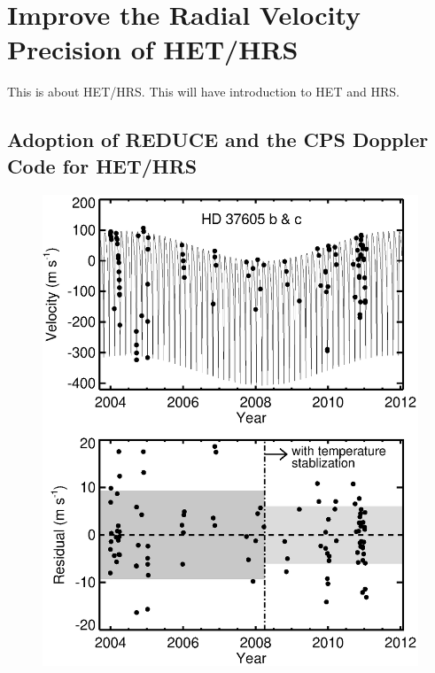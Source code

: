 \chapter{Improve the Radial Velocity Precision of HET/HRS}\label{chap:het}

This is about HET/HRS. This will have introduction to HET and HRS.

\section{Adoption of REDUCE and the CPS Doppler Code for HET/HRS}


\begin{figure}
\centering
\includegraphics[scale=0.5]{het/37605.eps}
\caption{
\label{het:fig:tempstable}}
\end{figure}





